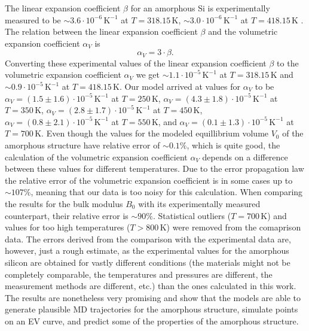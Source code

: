 The linear expansion coefficient $\beta$ for an amorphous Si is experimentally
measured to be $\sim 3.6 \cdot 10^{-6} \, \mathrm{K}^{-1}$ at
$T = 318.15 \, \mathrm{K}$, $\sim 3.0 \cdot 10^{-6} \, \mathrm{K}^{-1}$ at
$T = 418.15 \, \mathrm{K}$ \cite{TAKIMOTO2002314}. The relation between the
linear expansion coefficient $\beta$ and the volumetric expansion coefficient
$\alpha_V$ is
\begin{equation}
  \alpha_V = 3 \cdot \beta.
\end{equation}
Converting these experimental values of the linear expansion coefficient $\beta$ to the
volumetric expansion coefficient $\alpha_V$ we get
$\sim 1.1 \cdot 10^{-5} \, \mathrm{K}^{-1}$ at $T = 318.15 \, \mathrm{K}$ and
$\sim 0.9 \cdot 10^{-5} \, \mathrm{K}^{-1}$ at $T = 418.15 \, \mathrm{K}$.
Our model arrived at values for $\alpha_V$ to be
$\alpha_V = (1.5 \pm 1.6) \cdot 10^{-5} \, \mathrm{K}^{-1}$ at $T = 250 \, \mathrm{K}$,
$\alpha_V = (4.3 \pm 1.8) \cdot 10^{-5} \, \mathrm{K}^{-1}$ at $T = 350 \, \mathrm{K}$,
$\alpha_V = (2.8 \pm 1.7) \cdot 10^{-5} \, \mathrm{K}^{-1}$ at $T = 450 \, \mathrm{K}$,
$\alpha_V = (0.8 \pm 2.1) \cdot 10^{-5} \, \mathrm{K}^{-1}$ at $T = 550 \, \mathrm{K}$,
and $\alpha_V = (0.1 \pm 1.3) \cdot 10^{-5} \, \mathrm{K}^{-1}$ at $T = 700 \, \mathrm{K}$.
Even though the values for the modeled equillibrium volume $V_0$ of the
amorphous structure have relative error of $\sim 0.1 \%$, which is quite good,
the calculation of the volumetric expansion coefficient $\alpha_V$ depends on
a difference between these values for different temperatures. Due to the error
propagation law the relative error of the volumetric expansion coefficient is
in some cases up to $\sim 107 \%$, meaning that our data is too noisy for this
calculation. When comparing the results for the bulk modulus $B_0$ with its
experimentally measured counterpart, their relative error is $\sim 90 \%$.
Statistical outliers ($T = 700 \, \mathrm{K}$) and values for too high
temperatures ($T > 800 \, \mathrm{K}$) were removed from the comaprison data.
The errors derived from the comparison with the experimental data are, however, just a rough estimate,
as the experimental values for the amorphous silicon are obtained for vastly
different conditions (the materials might not be completely comparable, the
temperatures and pressures are different, the measurement methods are different, etc.) than the
ones calculated in this work. The results are nonetheless very promising and
show that the models are able to generate plausible MD trajectories for the
amorphous structure, simulate points on an EV curve, and predict some of the
properties of the amorphous structure.
